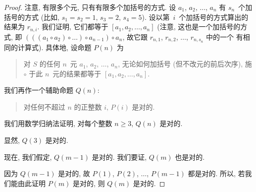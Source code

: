 \documentclass[../libro.tex]{subfiles}
\begin{document}
\begin{proof}
    注意, 有限多个元, 只有有限多个加括号的方式.
    设 \(a_1\), \(a_2\), \(\dots\), \(a_n\)
    有 \(s_n\)~个加括号的方式
    (比如, \(s_1 = s_2 = 1\),
    \(s_3 = 2\), \(s_4 = 5\)).
    设以第~\(i\)~个加括号的方式算出的结果为 \(r_{n,i}\).
    我们证明,
    它们都等于
    \([a_1, a_2, \dots, a_n]\)
    (注意, 这也是一个加括号的方式, %
    即
    \((((a_1 \circ a_2) \circ \dots) \circ a_{n-1}) \circ a_n\),
    故它跟 \(r_{n,1}\), \(r_{n,2}\), \(\dots\),
    \(r_{n,s_n}\) 中的一个%
    有相同的计算式). %
    具体地, 设命题 \(P(n)\) 为
    \begin{quotation}
        对 \(S\) 的任何 \(n\)~元
        \(a_1\), \(a_2\), \(\dots\), \(a_n\),
        无论如何加括号
        (但不改元的前后次序),
        施 \(\circ\) 于此 \(n\)~元的结果都等于
        \([a_1, a_2, \dots, a_n]\).
    \end{quotation}
    我们再作一个辅助命题 \(Q(n)\):
    \begin{quotation}
        对任何不超过 \(n\) 的正整数 \(i\),
        \(P(i)\) 是对的.
    \end{quotation}
    我们用数学归纳法证明,
    对每个整数 \(n \geq 3\),
    \(Q(n)\) 是对的.

    显然, \(Q(3)\) 是对的.

    现在, 我们假定, \(Q(m-1)\) 是对的.
    我们要证, \(Q(m)\) 也是对的.

    因为 \(Q(m-1)\) 是对的,
    故 \(P(1)\), \(P(2)\), \(\dots\), \(P(m-1)\) 都是对的.
    所以, 若我们能由此证明 \(P(m)\) 是对的,
    则 \(Q(m)\) 是对的.


\end{proof}
\end{document}
